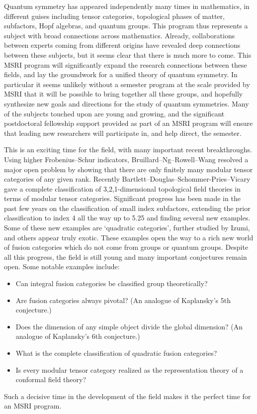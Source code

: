 \documentclass[12pt]{article}
\begin{document}
Quantum symmetry has appeared independently many times in mathematics, in different guises including tensor categories, topological phases of matter, subfactors, Hopf algebras, and quantum groups. This program thus represents a subject with broad connections across mathematics. Already, collaborations between experts coming from different origins have revealed deep connections between these subjects, but it seems clear that there is much more to come. This MSRI program will significantly expand the research connections between these fields, and lay the groundwork for a unified theory of quantum symmetry. In particular it seems unlikely without a semester program at the scale provided by MSRI that it will be possible to bring together all these groups, and hopefully synthesize new goals and directions for the study of quantum symmetries. Many of the subjects touched upon are young and growing, and the significant postdoctoral fellowship support provided as part of an MSRI program will ensure that leading new researchers will participate in, and help direct, the semester.

This is an exciting time for the field, with many important recent breakthroughs. Using higher Frobenius--Schur indicators, Bruillard--Ng--Rowell--Wang resolved a major open problem by showing that there are only finitely many modular tensor categories of any given rank. Recently Bartlett--Douglas--Schommer-Pries--Vicary gave a complete classification of 3,2,1-dimensional topological field theories in terms of modular tensor categories. Significant progress has been made in the past few years on the classification of small index subfactors, extending the prior classification to index 4 all the way up to 5.25 and finding several new examples. Some of these new examples are `quadratic categories', further studied by Izumi, and others appear truly exotic. These examples open the way to a rich new world of fusion categories which do not come from groups or quantum groups.  Despite all this progress, the field is still young and many important conjectures remain open. Some notable examples include:
\begin{itemize}
  \setlength{\itemsep}{1pt}
  \setlength{\parskip}{0pt}
  \setlength{\parsep}{0pt}
\item Can integral fusion categories be classified group theoretically?
\item Are fusion categories always pivotal? (An analogue of Kaplansky's 5th conjecture.)
\item Does the dimension of any simple object divide the global dimension? (An analogue of Kaplansky's 6th conjecture.)
\item What is the complete classification of quadratic fusion categories?
\item Is every modular tensor category realized as the representation theory of a conformal field theory?
\end{itemize}
Such a decisive time in the development of the field makes it the perfect time for an MSRI program.
\end{document}
